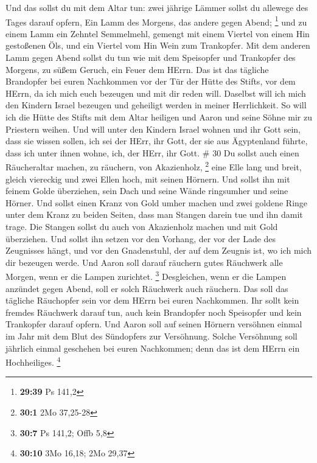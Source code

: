  Und das sollst du mit dem Altar tun: zwei jährige Lämmer
sollst du allewege des Tages darauf opfern,  Ein Lamm des
Morgens, das andere gegen Abend; \footnote{\textbf{29:39} Ps 141,2}
 und zu einem Lamm ein Zehntel Semmelmehl, gemengt mit
einem Viertel von einem Hin gestoßenen Öls, und ein Viertel vom Hin Wein
zum Trankopfer.  Mit dem anderen Lamm gegen Abend sollst du
tun wie mit dem Speisopfer und Trankopfer des Morgens, zu süßem Geruch,
ein Feuer dem HErrn.  Das ist das tägliche Brandopfer bei
euren Nachkommen vor der Tür der Hütte des Stifts, vor dem HErrn, da ich
mich euch bezeugen und mit dir reden will.  Daselbst will
ich mich den Kindern Israel bezeugen und geheiligt werden in meiner
Herrlichkeit.  So will ich die Hütte des Stifts mit dem
Altar heiligen und Aaron und seine Söhne mir zu Priestern weihen.
 Und will unter den Kindern Israel wohnen und ihr Gott
sein,  dass sie wissen sollen, ich sei der HErr, ihr Gott,
der sie aus Ägyptenland führte, dass ich unter ihnen wohne, ich, der
HErr, ihr Gott. \# 30  Du sollst auch einen Räucheraltar
machen, zu räuchern, von Akazienholz, \footnote{\textbf{30:1} 2Mo
  37,25-28}  eine Elle lang und breit, gleich viereckig und
zwei Ellen hoch, mit seinen Hörnern.  Und sollst ihn mit
feinem Golde überziehen, sein Dach und seine Wände ringsumher und seine
Hörner. Und sollst einen Kranz von Gold umher machen  und
zwei goldene Ringe unter dem Kranz zu beiden Seiten, dass man Stangen
darein tue und ihn damit trage.  Die Stangen sollst du auch
von Akazienholz machen und mit Gold überziehen.  Und sollst
ihn setzen vor den Vorhang, der vor der Lade des Zeugnisses hängt, und
vor den Gnadenstuhl, der auf dem Zeugnis ist, wo ich mich dir bezeugen
werde.  Und Aaron soll darauf räuchern gutes Räuchwerk alle
Morgen, wenn er die Lampen zurichtet. \footnote{\textbf{30:7} Ps 141,2;
  Offb 5,8}  Desgleichen, wenn er die Lampen anzündet gegen
Abend, soll er solch Räuchwerk auch räuchern. Das soll das tägliche
Räuchopfer sein vor dem HErrn bei euren Nachkommen.  Ihr
sollt kein fremdes Räuchwerk darauf tun, auch kein Brandopfer noch
Speisopfer und kein Trankopfer darauf opfern.  Und Aaron
soll auf seinen Hörnern versöhnen einmal im Jahr mit dem Blut des
Sündopfers zur Versöhnung. Solche Versöhnung soll jährlich einmal
geschehen bei euren Nachkommen; denn das ist dem HErrn ein Hochheiliges.
\footnote{\textbf{30:10} 3Mo 16,18; 2Mo 29,37}

